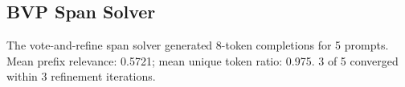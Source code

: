 \subsection{BVP Span Solver}
The vote-and-refine span solver generated 8-token completions for 5 prompts.
Mean prefix relevance: 0.5721; mean unique token ratio: 0.975.
3 of 5 converged within 3 refinement iterations.
